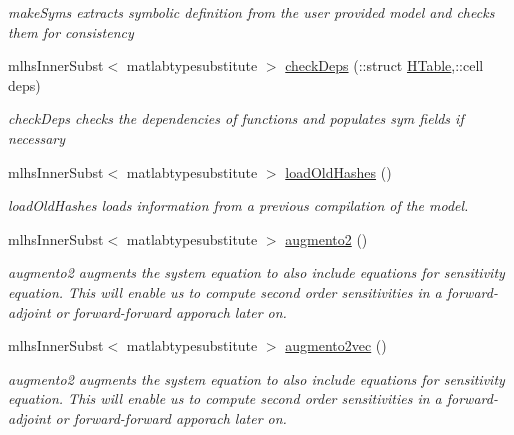 \begin{DoxyCompactItemize}
\begin{DoxyCompactList}\small\item\em make\+Syms extracts symbolic definition from the user provided model and checks them for consistency \end{DoxyCompactList}\item 
mlhs\+Inner\+Subst$<$ matlabtypesubstitute $>$ \hyperlink{classamimodel_ab566026e57f6cbce21a2a2c72b9f7f2b}{check\+Deps} (\+::struct \hyperlink{classamimodel_aafe6335df413dd688a2f44efba012cf1}{H\+Table},\+::cell deps)
\begin{DoxyCompactList}\small\item\em check\+Deps checks the dependencies of functions and populates sym fields if necessary \end{DoxyCompactList}\item 
mlhs\+Inner\+Subst$<$ matlabtypesubstitute $>$ \hyperlink{classamimodel_a93346c96338624e417ee9732ffd96b28}{load\+Old\+Hashes} ()
\begin{DoxyCompactList}\small\item\em load\+Old\+Hashes loads information from a previous compilation of the model. \end{DoxyCompactList}\item 
mlhs\+Inner\+Subst$<$ matlabtypesubstitute $>$ \hyperlink{classamimodel_abddb278082c1ff018f3b0ef121bba51a}{augmento2} ()
\begin{DoxyCompactList}\small\item\em augmento2 augments the system equation to also include equations for sensitivity equation. This will enable us to compute second order sensitivities in a forward-\/adjoint or forward-\/forward apporach later on. \end{DoxyCompactList}\item 
mlhs\+Inner\+Subst$<$ matlabtypesubstitute $>$ \hyperlink{classamimodel_aaed774df1b9efcebe493ae9f499bb8cf}{augmento2vec} ()
\begin{DoxyCompactList}\small\item\em augmento2 augments the system equation to also include equations for sensitivity equation. This will enable us to compute second order sensitivities in a forward-\/adjoint or forward-\/forward apporach later on. \end{DoxyCompactList}\end{DoxyCompactItemize}
